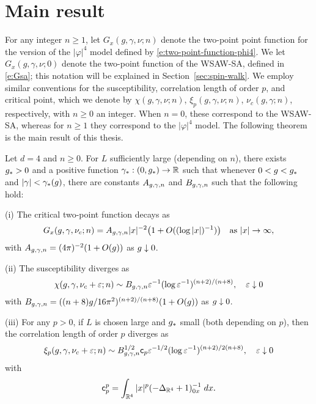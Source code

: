 \section{Main result}
\label{sec:mr}

For any integer $n \ge 1$, let $G_x(g, \gamma, \nu; n)$
denote the two-point point function for the version of the $|\varphi|^4$ model
defined by \eqref{e:two-point-function-phi4}.
We let $G_x(g, \gamma, \nu; 0)$ denote the two-point function of the WSAW-SA,
defined in \eqref{e:Gsa}; this notation will be explained in Section~\ref{sec:spin-walk}.
We employ similar conventions for the susceptibility, correlation length of order $p$,
and critical point, which we denote by
$\chi(g, \gamma, \nu; n)$, $\xi_p(g, \gamma, \nu; n)$, $\nu_c(g, \gamma; n)$, respectively,
with $n \ge 0$ an integer.
When $n = 0$, these correspond to the WSAW-SA, whereas for $n \ge 1$ they correspond to the
$|\varphi|^4$ model. The following theorem is the main result of this thesis.

\begin{theorem}
\label{thm:mr}
Let $d = 4$ and $n \ge 0$. For $L$ sufficiently large (depending on $n$),
there exists $g_* > 0$ and a positive function $\gamma_* : (0, g_*) \rightarrow {\mathbb R}$
such that whenever $0 < g < g_*$ and $|\gamma| < \gamma_*(g)$,
there are constants $A_{g,\gamma,n}$ and $B_{g,\gamma,n}$ such that the following hold:

\smallskip\noindent
(i)
The critical two-point function decays as
\begin{equation}
G_x(g,\gamma,\nu_c; n)
    =
A_{g,\gamma,n} |x|^{-2} \big(1 + O((\log |x|)^{-1})\big)
    \quad
\text{as $|x|\rightarrow\infty$},
\end{equation}
with $A_{g,\gamma,n} = (4 \pi)^{-2} (1 + O(g))$ as $g \downarrow 0$.

\smallskip\noindent
(ii)
The susceptibility diverges as
\begin{equation} \label{e:chieps-asympt}
\chi(g, \gamma, \nu_c + \varepsilon; n)
	\sim
B_{g,\gamma,n} \varepsilon^{-1} (\log \varepsilon^{-1})^{(n+2)/(n+8)},
	\quad
\varepsilon\downarrow 0
\end{equation}
with $B_{g,\gamma,n} = ((n + 8) g / 16\pi^2)^{(n+2)/(n+8)} (1 + O(g))$
as $g \downarrow 0$.

\smallskip\noindent
(iii)
For any $p >0$, if $L$ is chosen large and $g_*$ small (both depending on $p$),
then the correlation length of order $p$ diverges as
\begin{equation} \label{e:xieps-asympt}
\xi_p(g, \gamma, \nu_c + \varepsilon; n)
	\sim
B_{g,\gamma,n}^{1/2} {\sf c}_p \varepsilon^{-1/2} (\log \varepsilon^{-1})^{(n+2)/2(n+8)},
	\quad
\varepsilon\downarrow 0
\end{equation}
with
\begin{equation}
\label{e:cpdef}
{\sf c}_p^p
	=
\int_{{\mathbb R}^4} |x|^p (-\Delta_{{\mathbb R}^4} + 1)^{-1}_{0x} \; dx.
\end{equation}
\end{theorem}

